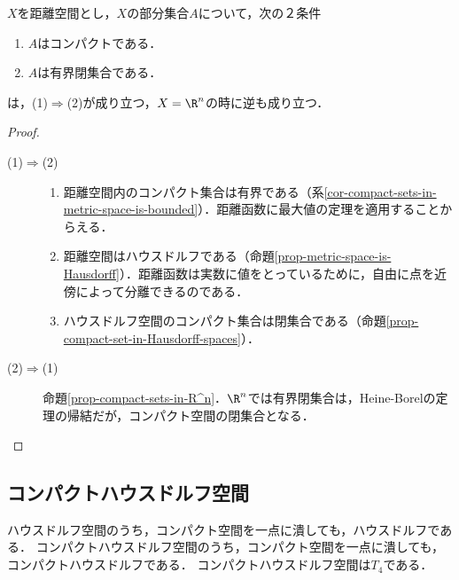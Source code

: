 \documentclass[uplatex,dvipdfmx]{jsreport}
\begin{document}
\begin{corollary}[コンパクトではない空間でのコンパクト集合]
    $X$を距離空間とし，$X$の部分集合$A$について，次の２条件
    \begin{enumerate}[(1)]
        \item $A$はコンパクトである．
        \item $A$は有界閉集合である．
    \end{enumerate}
    は，(1)$\Rightarrow$(2)が成り立つ，$X=\R^n$の時に逆も成り立つ．
\end{corollary}
\begin{proof}\mbox{}
    \begin{description}
        \item[(1)$\Rightarrow$(2)] 
        \begin{enumerate}
            \item 距離空間内のコンパクト集合は有界である（系\ref{cor-compact-sets-in-metric-space-is-bounded}）．距離函数に最大値の定理を適用することからえる．
            \item 距離空間はハウスドルフである（命題\ref{prop-metric-space-is-Hausdorff}）．距離函数は実数に値をとっているために，自由に点を近傍によって分離できるのである．
            \item ハウスドルフ空間のコンパクト集合は閉集合である（命題\ref{prop-compact-set-in-Hausdorff-spaces}）．
        \end{enumerate}
        \item[(2)$\Rightarrow$(1)]
        命題\ref{prop-compact-sets-in-R^n}．$\R^n$では有界閉集合は，Heine-Borelの定理の帰結だが，コンパクト空間の閉集合となる．
    \end{description}
\end{proof}

\subsection{コンパクトハウスドルフ空間}

\begin{tcolorbox}[colframe=ForestGreen, colback=ForestGreen!10!white, breakable ,colbacktitle=ForestGreen!40!white, coltitle=black,fonttitle=\bfseries\sffamily]
    ハウスドルフ空間のうち，コンパクト空間を一点に潰しても，ハウスドルフである．
    コンパクトハウスドルフ空間のうち，コンパクト空間を一点に潰しても，コンパクトハウスドルフである．
    コンパクトハウスドルフ空間は$T_4$である．
\end{tcolorbox}
\end{document}
